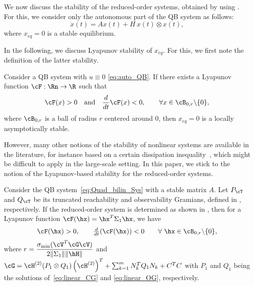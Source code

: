 We now discuss the stability of the reduced-order systems, obtained by using . For this, we consider only the autonomous part of the QB system as follows:
\begin{equation}\label{eq:auto_QB}
\dot{x}(t) = Ax(t) + H~x(t)\otimes x(t),
\end{equation}
where $x_{eq} = 0$ is a stable equilibrium. 
{%
In the following, we discuss Lyapunov stability of $x_{eq}$. For this, we first note the definition of the latter stability.
\begin{definition}
	Consider a  QB system with $u\equiv 0$ \eqref{eq:auto_QB}. If there exists a Lyapunov function $\cF : \Rn \rightarrow \R$ such that 
	\begin{equation*}
	\cF(x) >0\quad\mbox{and}\quad \dfrac{d}{dt}\cF(x)<0,\qquad \forall x\in \cB_{0,r}\backslash \{0\},
	\end{equation*}
	where $\cB_{0,r}$ is a ball of radius $r$ centered around $0$, then $x_{eq} = 0$ is a locally asymptotically stable. 
\end{definition}
}
However, many other notions of the stability of nonlinear systems are available in the literature, for instance based on a certain dissipation inequality~\cite{bond2010compact}, which might be difficult to apply in the large-scale setting. In this paper, we stick to the notion of the Lyapunov-based stability for the reduced-order systems.
\begin{theorem}
Consider the QB system~\eqref{eq:Quad_bilin_Sys} with a  stable matrix  $A$. Let $P_\cT$ and $Q_\cT$ be its truncated reachability and observability Gramians, defined in , respectively. If the reduced-order system is determined as shown in , then for a Lyapunov function $\cF(\hx) = \hx^T\Sigma_1\hx$, we have
$$\cF(\hx) >0,\qquad \tfrac{d}{dt}(\cF(\hx)) <0\qquad \forall~ \hx \in \cB_{0,r}\backslash \{0\},$$
where $r = \dfrac{\sigma_{\min}(\cV^T\cG\cV)}{2 \|\Sigma_1\| \|\hH\|}$
and $\cG =  \cH^{(2)}(P_1\otimes Q_1) \left(\cH^{(2)}\right)^T + \sum_{k=1}^mN_k^TQ_1N_k +C^TC$ with $P_1$ and $Q_1$ being  the solutions of~\eqref{eq:linear_CG} and \eqref{eq:linear_OG}, respectively.
\end{theorem}\label{thm:stability}
